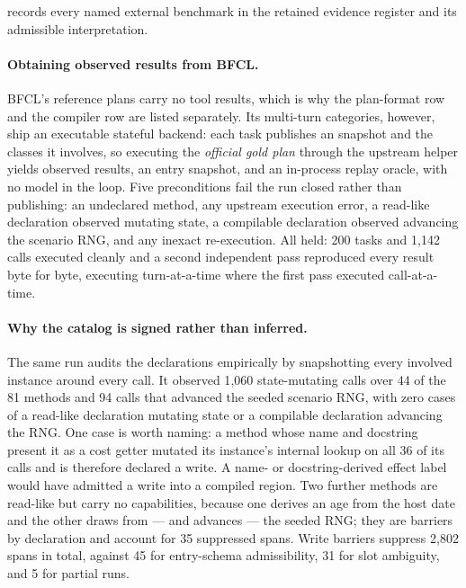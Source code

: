  records every named external benchmark in the
retained evidence register and its admissible interpretation.

\paragraph{Obtaining observed results from BFCL.}
BFCL's reference plans carry no tool results, which is why the plan-format row
and the compiler row are listed separately. Its multi-turn categories, however,
ship an executable stateful backend: each task publishes an
 snapshot and the classes it involves, so executing the
\emph{official gold plan} through the upstream helper yields observed results,
an entry snapshot, and an in-process replay oracle, with no model in the loop.
Five preconditions fail the run closed rather than publishing: an undeclared
method, any upstream execution error, a read-like declaration observed mutating
state, a compilable declaration observed advancing the scenario RNG, and any
inexact re-execution. All held: 200 tasks and 1{,}142 calls executed cleanly and
a second independent pass reproduced every result byte for byte, executing
turn-at-a-time where the first pass executed call-at-a-time.

\paragraph{Why the catalog is signed rather than inferred.}
The same run audits the declarations empirically by snapshotting every involved
instance around every call. It observed 1{,}060 state-mutating calls over 44 of
the 81 methods and 94 calls that advanced the seeded scenario RNG, with zero
cases of a read-like declaration mutating state or a compilable declaration
advancing the RNG. One case is worth naming: a method whose name and docstring
present it as a cost getter mutated its instance's internal lookup on all 36 of
its calls and is therefore declared a write. A name- or docstring-derived effect
label would have admitted a write into a compiled region. Two further methods
are read-like but carry no capabilities, because one derives an age from the
host date and the other draws from --- and advances --- the seeded RNG; they are
barriers by declaration and account for 35 suppressed spans. Write barriers
suppress 2{,}802 spans in total, against 45 for entry-schema admissibility, 31
for slot ambiguity, and 5 for partial runs.

